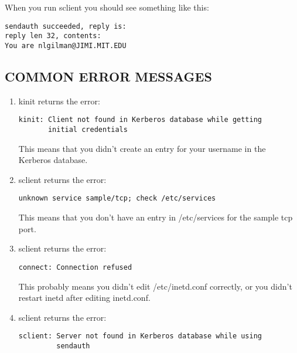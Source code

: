 \documentclass[letterpaper,10pt,english]{sphinxmanual}
\begin{document}
When you run sclient you should see something like this:

\begin{Verbatim}[commandchars=\\\{\}]
sendauth succeeded, reply is:
reply len 32, contents:
You are nlgilman@JIMI.MIT.EDU
\end{Verbatim}


\subsection{COMMON ERROR MESSAGES}
\label{admin/admin_commands/sserver:common-error-messages}\begin{enumerate}
\item {} 
kinit returns the error:

\begin{Verbatim}[commandchars=\\\{\}]
kinit: Client not found in Kerberos database while getting
       initial credentials
\end{Verbatim}

This means that you didn't create an entry for your username in the
Kerberos database.

\item {} 
sclient returns the error:

\begin{Verbatim}[commandchars=\\\{\}]
unknown service sample/tcp; check /etc/services
\end{Verbatim}

This means that you don't have an entry in /etc/services for the
sample tcp port.

\item {} 
sclient returns the error:

\begin{Verbatim}[commandchars=\\\{\}]
connect: Connection refused
\end{Verbatim}

This probably means you didn't edit /etc/inetd.conf correctly, or
you didn't restart inetd after editing inetd.conf.

\item {} 
sclient returns the error:

\begin{Verbatim}[commandchars=\\\{\}]
sclient: Server not found in Kerberos database while using
         sendauth
\end{Verbatim}


\end{enumerate}
\end{document}
